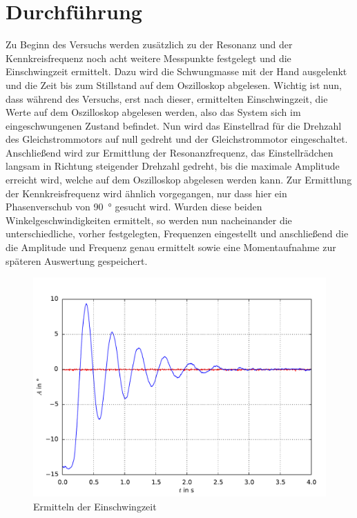 \documentclass[a4paper,12pt]{scrartcl}
\begin{document}
\section{Durchführung}
Zu Beginn des Versuchs werden zusätzlich zu der Resonanz und der Kennkreisfrequenz noch acht weitere Messpunkte festgelegt und die Einschwingzeit ermittelt.
Dazu wird die Schwungmasse mit der Hand ausgelenkt und die Zeit bis zum Stillstand auf dem Oszilloskop abgelesen. Wichtig ist nun, dass während des
Versuchs, erst nach dieser, ermittelten Einschwingzeit, die Werte auf dem Oszilloskop abgelesen werden, also das System sich im eingeschwungenen Zustand
befindet. Nun wird das Einstellrad für die Drehzahl des Gleichstrommotors auf null gedreht und der Gleichstrommotor eingeschaltet. Anschließend wird zur
Ermittlung der Resonanzfrequenz, das Einstellrädchen langsam in Richtung steigender Drehzahl gedreht, bis die maximale Amplitude erreicht wird, welche auf
dem Oszilloskop abgelesen werden kann. Zur Ermittlung der Kennkreisfrequenz wird ähnlich vorgegangen, nur dass hier ein Phasenverschub von  \SI{90}{\degree} gesucht wird.
Wurden diese beiden Winkelgeschwindigkeiten ermittelt, so werden nun nacheinander die unterschiedliche, vorher festgelegten, Frequenzen eingestellt und
anschließend die die Amplitude und Frequenz  genau ermittelt sowie eine Momentaufnahme zur späteren Auswertung gespeichert.

\begin{figure}[h]
\centering
\includegraphics[width=\textwidth]{ausschwingen.pdf}
\caption{Ermitteln der Einschwingzeit}
\label{fig:plot-ausschwingen}
\end{figure}
\end{document}

